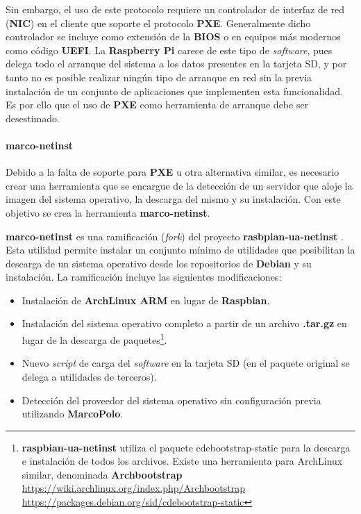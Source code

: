 Sin embargo, el uso de este protocolo requiere un controlador de interfaz de red (\textbf{NIC}) en el cliente que soporte el protocolo \textbf{PXE}. Generalmente dicho controlador se incluye como extensión de la \textbf{BIOS} o en equipos más modernos como código \textbf{UEFI}. La \textbf{Raspberry Pi} carece de este tipo de \textit{software}, pues delega todo el arranque del sistema a los datos presentes en la tarjeta SD, y por tanto no es posible realizar ningún tipo de arranque en red sin la previa instalación de un conjunto de aplicaciones que implementen esta funcionalidad. Es por ello que el uso de \textbf{PXE} como herramienta de arranque debe ser desestimado.

\paragraph{marco-netinst\\}

Debido a la falta de soporte para \textbf{PXE} u otra alternativa similar, es necesario crear una herramienta que se encargue de la detección de un servidor que aloje la imagen del sistema operativo, la descarga del mismo y su instalación. Con este objetivo se crea la herramienta \textbf{marco-netinst}.

\textbf{marco-netinst} es una ramificación (\textit{fork}) del proyecto \textbf{rasbpian-ua-netinst} \cite{raspbian-ua-netinst}. Esta utilidad permite instalar un conjunto mínimo de utilidades que posibilitan la descarga de un sistema operativo desde los repositorios de \textbf{Debian} y su instalación. La ramificación incluye las siguientes modificaciones:

\begin{itemize}
	\item Instalación de \textbf{ArchLinux ARM} en lugar de \textbf{Raspbian}.
	\item Instalación del sistema operativo completo a partir de un archivo \textbf{.tar.gz} en lugar de la descarga de paquetes\footnote{\textbf{raspbian-ua-netinst} utiliza el paquete cdebootstrap-static para la descarga e instalación de todos los archivos. Existe una herramienta para ArchLinux similar, denominada \textbf{Archbootstrap}\\
	\href{https://wiki.archlinux.org/index.php/Archbootstrap}{https://wiki.archlinux.org/index.php/Archbootstrap}\\
	\href{https://packages.debian.org/sid/cdebootstrap-static}{https://packages.debian.org/sid/cdebootstrap-static}}.
	\item Nuevo \textit{script} de carga del \textit{software} en la tarjeta SD (en el paquete original se delega a utilidades de terceros).
	\item Detección del proveedor del sistema operativo sin configuración previa utilizando \textbf{MarcoPolo}.
\end{itemize}


